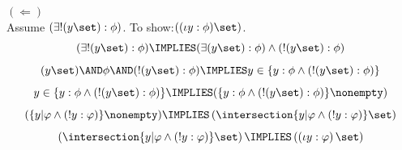 \noindent$(\Leftarrow)$\\
Assume $(\exists!(y\set):\phi)$. To show:$((\iota y:\phi)\set)$.
\[
(\exists!(y\set):\phi)
\IMPLIES
(\exists(y\set):\phi)
\land
(!(y\set):\phi)
\]
\[
(y\set)
\AND
\phi
\AND
(!(y\set):\phi)
\IMPLIES
y\in\{y:\phi\land(!(y\set):\phi)\}
\]
\[
y\in\{y:\phi\land(!(y\set):\phi)\}
\IMPLIES
(\{y:\phi\land(!(y\set):\phi)\}\nonempty)
\]
\[
(\{y|\varphi \land (!y:\varphi)\}\nonempty)
\IMPLIES
\left(\intersection \{y|\varphi \land (!y:\varphi)\} \set\right)
\]
\[
\left(\intersection \{y|\varphi \land (!y:\varphi)\} \set\right)
\IMPLIES
\left(\left(\iota y: \varphi\right) \set\right)
\]
\Done


